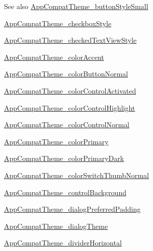 \begin{DoxySeeAlso}{See also}
\hyperlink{classproject4_1_1xaria_1_1R_1_1styleable_ab6a564eb1b7f2c965484ca489fb8e95c}{App\+Compat\+Theme\+\_\+button\+Style\+Small} 

\hyperlink{classproject4_1_1xaria_1_1R_1_1styleable_afad6cf2b0ee135e8a4df052b6eb4d916}{App\+Compat\+Theme\+\_\+checkbox\+Style} 

\hyperlink{classproject4_1_1xaria_1_1R_1_1styleable_a22209fcca0bd05c9f68f33c77180738e}{App\+Compat\+Theme\+\_\+checked\+Text\+View\+Style} 

\hyperlink{classproject4_1_1xaria_1_1R_1_1styleable_a6e46aba539289d70ed3d16e8e7bcb018}{App\+Compat\+Theme\+\_\+color\+Accent} 

\hyperlink{classproject4_1_1xaria_1_1R_1_1styleable_a84437157df751a100d61fc0f2d910f0b}{App\+Compat\+Theme\+\_\+color\+Button\+Normal} 

\hyperlink{classproject4_1_1xaria_1_1R_1_1styleable_ade53ff10ccbf446032b640b82cfcd1d8}{App\+Compat\+Theme\+\_\+color\+Control\+Activated} 

\hyperlink{classproject4_1_1xaria_1_1R_1_1styleable_a9951a735820466ee03e784ca50e2c4f4}{App\+Compat\+Theme\+\_\+color\+Control\+Highlight} 

\hyperlink{classproject4_1_1xaria_1_1R_1_1styleable_ab2853953a006b42c5c1b2506859cd11f}{App\+Compat\+Theme\+\_\+color\+Control\+Normal} 

\hyperlink{classproject4_1_1xaria_1_1R_1_1styleable_a7389b87a9f3b557790bc968515833ae4}{App\+Compat\+Theme\+\_\+color\+Primary} 

\hyperlink{classproject4_1_1xaria_1_1R_1_1styleable_ae0e5b2077cb1158569a4fbda2aa8dd71}{App\+Compat\+Theme\+\_\+color\+Primary\+Dark} 

\hyperlink{classproject4_1_1xaria_1_1R_1_1styleable_acfe6607b27354b339604b23a504dfad6}{App\+Compat\+Theme\+\_\+color\+Switch\+Thumb\+Normal} 

\hyperlink{classproject4_1_1xaria_1_1R_1_1styleable_a476553481ffe8e73dfc05dfcd351d945}{App\+Compat\+Theme\+\_\+control\+Background} 

\hyperlink{classproject4_1_1xaria_1_1R_1_1styleable_a23b0ff0c142da87ba4d26058c02051dd}{App\+Compat\+Theme\+\_\+dialog\+Preferred\+Padding} 

\hyperlink{classproject4_1_1xaria_1_1R_1_1styleable_a5519afdb0c80e54310abbe3db266a072}{App\+Compat\+Theme\+\_\+dialog\+Theme} 

\hyperlink{classproject4_1_1xaria_1_1R_1_1styleable_ade51be41034a192ff35bec03ba87a1aa}{App\+Compat\+Theme\+\_\+divider\+Horizontal} 


\end{DoxySeeAlso}
